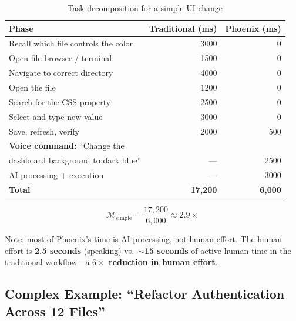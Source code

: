 \documentclass[11pt, a4paper]{article}
\begin{document}
\begin{table}[h]
\centering
\begin{tabular}{@{}lrr@{}}
\toprule
\textbf{Phase} & \textbf{Traditional (ms)} & \textbf{Phoenix (ms)} \\
\midrule
Recall which file controls the color  & 3000 & 0 \\
Open file browser / terminal          & 1500 & 0 \\
Navigate to correct directory          & 4000 & 0 \\
Open the file                          & 1200 & 0 \\
Search for the CSS property            & 2500 & 0 \\
Select and type new value              & 3000 & 0 \\
Save, refresh, verify                  & 2000 & 500 \\
\midrule
\textbf{Voice command:} ``Change the    &       &      \\
\quad dashboard background to dark blue'' & --- & 2500 \\
AI processing + execution              & ---  & 3000 \\
\midrule
\textbf{Total}                         & \textbf{17,200} & \textbf{6,000} \\
\bottomrule
\end{tabular}
\caption{Task decomposition for a simple UI change}
\label{tab:example1}
\end{table}

\begin{equation}
  \mathcal{M}_{\text{simple}} = \frac{17{,}200}{6{,}000} \approx 2.9\times
\end{equation}

Note: most of Phoenix's time is AI processing, not human effort. The human effort is
\textbf{2.5 seconds} (speaking) vs.\ \textbf{$\sim$15 seconds} of active human
time in the traditional workflow---a \textbf{$6\times$ reduction in human effort}.

\subsection{Complex Example: ``Refactor Authentication Across 12 Files''}
\end{document}
